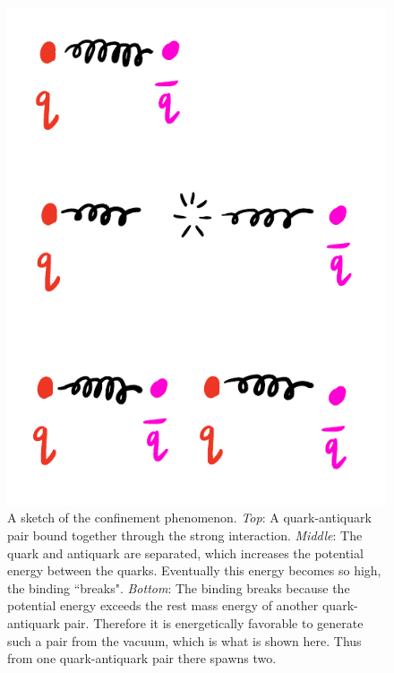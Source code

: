 \begin{figure}
  \centering
  \includegraphics[width=0.8\linewidth]{figs/confinement.pdf}
  \caption{A sketch of the confinement phenomenon. {\it Top}: A quark-antiquark
pair bound together through the strong interaction. {\it Middle}: The quark and
antiquark are separated, which increases the potential energy between the
quarks. Eventually this energy becomes so high, the binding ``breaks".
{\it Bottom}: The binding breaks because the potential energy exceeds the rest
mass energy of another quark-antiquark pair. Therefore it is energetically
favorable to generate such a pair from the vacuum, which is what is shown here.
Thus from one quark-antiquark pair there spawns two.} 
  \label{fig:confinement} 
\end{figure}

